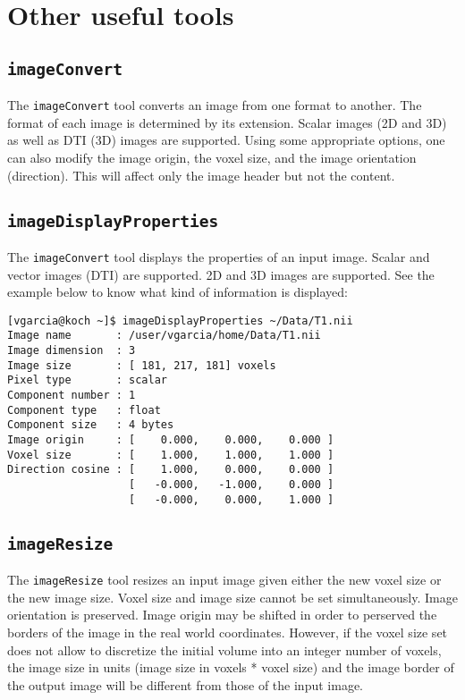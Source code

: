 \section{Other useful tools}



\subsection{\texttt{imageConvert}}

The \texttt{imageConvert} tool converts an image from one format to another. The format of each image is determined by its extension. Scalar images (2D and 3D) as well as DTI (3D) images are supported. Using some appropriate options, one can also modify the image origin, the voxel size, and the image orientation (direction). This will affect only the image header but not the content.



\subsection{\texttt{imageDisplayProperties}}

The \texttt{imageConvert} tool displays the properties of an input image. Scalar and vector images (DTI) are supported. 2D and 3D images are supported. See the example below to know what kind of information is displayed:
 
\begin{lstlisting}
[vgarcia@koch ~]$ imageDisplayProperties ~/Data/T1.nii 
Image name       : /user/vgarcia/home/Data/T1.nii
Image dimension  : 3
Image size       : [ 181, 217, 181] voxels
Pixel type       : scalar
Component number : 1
Component type   : float
Component size   : 4 bytes
Image origin     : [    0.000,    0.000,    0.000 ]
Voxel size       : [    1.000,    1.000,    1.000 ]
Direction cosine : [    1.000,    0.000,    0.000 ]
                   [   -0.000,   -1.000,    0.000 ]
                   [   -0.000,    0.000,    1.000 ]
\end{lstlisting}



\subsection{\texttt{imageResize}}

The \texttt{imageResize} tool resizes an input image given either the new voxel size or the new image size. Voxel size and image size cannot be set simultaneously. Image orientation is preserved. Image origin may be shifted in order to perserved the borders of the image in the real world coordinates. However, if the voxel size set does not allow to discretize the initial volume into an integer number of voxels, the image size in units (image size in voxels * voxel size) and the image border of the output image will be different from those of the input image.